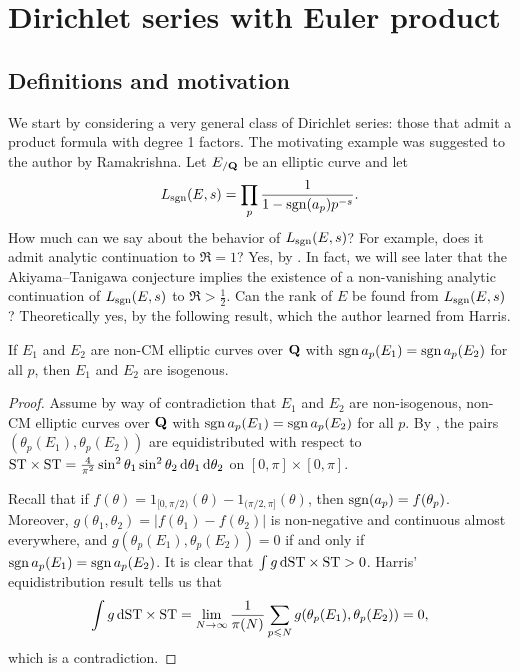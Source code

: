 
\chapter{Dirichlet series with Euler product}\label{ch:Dirichlet-series}





\section{Definitions and motivation}

We start by considering a very general class of Dirichlet series: those that 
admit a product formula with degree 1 factors. The motivating example was 
suggested to the author by Ramakrishna. Let $E_{/\mathbf{Q}}$ be an elliptic 
curve and let 
\[
	L_{\operatorname{sgn}}(E,s) = \prod_p \frac{1}{1-\operatorname{sgn}(a_p) p^{-s}} .
\]
How much can we say about the behavior of $L_{\operatorname{sgn}}(E,s)$? For example, does it 
admit analytic continuation to $\Re = 1$? Yes, by 
\cite[A.2]{serre-1989}. In fact, we will see later that the Akiyama--Tanigawa 
conjecture implies the existence of a non-vanishing analytic continuation of 
$L_{\operatorname{sgn}}(E,s)$ to $\Re > \frac 1 2$. Can the rank of $E$ be 
found from $L_{\operatorname{sgn}}(E,s)$? Theoretically yes, by the following result, which 
the author learned from Harris. 

\begin{theorem}
If $E_1$ and $E_2$ are non-CM elliptic curves over $\mathbf{Q}$ with 
$\operatorname{sgn} a_p(E_1) = \operatorname{sgn} a_p(E_2)$ for all $p$, then $E_1$ and $E_2$ are 
isogenous.
\end{theorem}
\begin{proof}
Assume by way of contradiction that $E_1$ and $E_2$ are non-isogenous, non-CM 
elliptic curves over $\mathbf{Q}$ with $\operatorname{sgn} a_p(E_1) = \operatorname{sgn} a_p(E_2)$ for all $p$. By 
\cite[5.4]{harris-2009}, the pairs $(\theta_p(E_1),\theta_p(E_2))$ are 
equidistributed with respect to 
$\mathrm{ST}\times \mathrm{ST} = \frac{4}{\pi^2} \sin^2\theta_1\sin^2\theta_2\, \mathrm{d}\theta_1\, \mathrm{d}\theta_2$ 
on $[0,\pi]\times [0,\pi]$. 

Recall that if $f(\theta) = 1_{[0,\pi/2)}(\theta) - 1_{(\pi/2,\pi]}(\theta)$, 
then $\operatorname{sgn}(a_p) = f(\theta_p)$. Moreover, 
$g(\theta_1,\theta_2) = |f(\theta_1) - f(\theta_2)|$ is non-negative and 
continuous almost everywhere, and $g(\theta_p(E_1),\theta_p(E_2)) = 0$ if and 
only if $\operatorname{sgn} a_p(E_1) = \operatorname{sgn} a_p(E_2)$. It is clear that 
$\int g\, \mathrm{d} \mathrm{ST}\times \mathrm{ST} > 0$. Harris' equidistribution result tells us that 
\[
	\int g\, \mathrm{d} \mathrm{ST}\times\mathrm{ST} = \lim_{N\to \infty} \frac{1}{\pi(N)} \sum_{p\leqslant N} g(\theta_p(E_1),\theta_p(E_2)) = 0 ,
\]
which is a contradiction. 
\end{proof}

